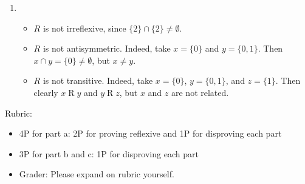 \documentclass{article}
\theoremstyle{definition}
\begin{document}
\begin{solution}
\begin{enumerate}
	\item 
	\begin{itemize}
		\item $ R$ is not irreflexive, since $\{2\} \cap \{2\} \neq \emptyset$.
		\item $ R$ is not antisymmetric. Indeed, take $x = \{ 0 \}$ and $y = \{0,1\}$. Then $x \cap y = \{0 \} \neq \emptyset$, but $x \neq y$.
		\item $ R$ is not transitive. Indeed, take $x = \{ 0 \}$, $y = \{0,1\}$, and $z = \{1\}$. Then clearly $x \mathrel{R}y$ and $y \mathrel{R}z$, but $x$ and $z$ are not related.
	\end{itemize}
     \end{enumerate}
 {\color{red} Rubric:
\begin{itemize}
\item 4P for part a: 2P for proving reflexive and 1P for disproving each part
\item 3P for part b and c: 1P for disproving each part
\item Grader: Please expand on rubric yourself.
\end{itemize}}
\end{solution}
\end{document}
